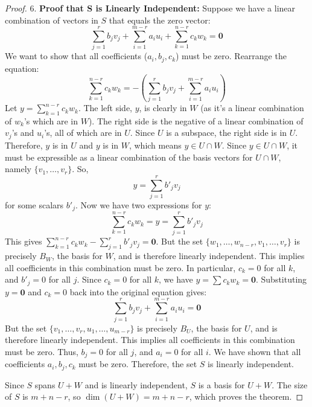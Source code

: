 \documentclass[11pt]{article}
\theoremstyle{plain}
\theoremstyle{definition}
\theoremstyle{remark}
\DeclareMathOperator{\dimv}{dim} %
\newcommand{\veczero}{\mathbf{0}} %
\begin{document}
\begin{proof}
6.  \textbf{Proof that S is Linearly Independent:}
    Suppose we have a linear combination of vectors in $S$ that equals the zero vector:
    \[ \sum_{j=1}^{r} b_j v_j + \sum_{i=1}^{m-r} a_i u_i + \sum_{k=1}^{n-r} c_k w_k = \veczero \]
    We want to show that all coefficients ($a_i, b_j, c_k$) must be zero. Rearrange the equation:
    \[ \sum_{k=1}^{n-r} c_k w_k = - \left( \sum_{j=1}^{r} b_j v_j + \sum_{i=1}^{m-r} a_i u_i \right) \]
    Let $y = \sum_{k=1}^{n-r} c_k w_k$.
    The left side, $y$, is clearly in $W$ (as it's a linear combination of $w_k$'s which are in $W$).
    The right side is the negative of a linear combination of $v_j$'s and $u_i$'s, all of which are in $U$. Since $U$ is a subspace, the right side is in $U$.
    Therefore, $y$ is in $U$ and $y$ is in $W$, which means $y \in U \cap W$.
    Since $y \in U \cap W$, it must be expressible as a linear combination of the basis vectors for $U \cap W$, namely $\{v_1, \dots, v_r\}$. So,
    \[ y = \sum_{j=1}^{r} b'_j v_j \]
    for some scalars $b'_j$.
    Now we have two expressions for $y$:
    \[ \sum_{k=1}^{n-r} c_k w_k = y = \sum_{j=1}^{r} b'_j v_j \]
    This gives $\sum_{k=1}^{n-r} c_k w_k - \sum_{j=1}^{r} b'_j v_j = \veczero$.
    But the set $\{w_1, \dots, w_{n-r}, v_1, \dots, v_r\}$ is precisely $B_W$, the basis for $W$, and is therefore linearly independent. This implies all coefficients in this combination must be zero. In particular, $c_k = 0$ for all $k$, and $b'_j = 0$ for all $j$.
    Since $c_k=0$ for all $k$, we have $y = \sum c_k w_k = \veczero$.
    Substituting $y=\veczero$ and $c_k=0$ back into the original equation gives:
    \[ \sum_{j=1}^{r} b_j v_j + \sum_{i=1}^{m-r} a_i u_i = \veczero \]
    But the set $\{v_1, \dots, v_r, u_1, \dots, u_{m-r}\}$ is precisely $B_U$, the basis for $U$, and is therefore linearly independent. This implies all coefficients in this combination must be zero. Thus, $b_j = 0$ for all $j$, and $a_i = 0$ for all $i$.
    We have shown that all coefficients $a_i, b_j, c_k$ must be zero. Therefore, the set $S$ is linearly independent.

Since $S$ spans $U+W$ and is linearly independent, $S$ is a basis for $U+W$. The size of $S$ is $m+n-r$, so $\dimv(U+W) = m+n-r$, which proves the theorem.
\end{proof}
\end{document}
